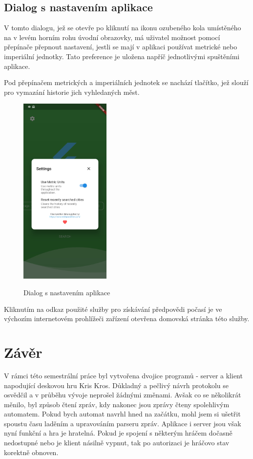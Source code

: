\documentclass[12pt, a4paper]{article}
\let\oldsection\section
\renewcommand\section{\clearpage\oldsection}
\begin{document}
\subsection{Dialog s nastavením aplikace}

V tomto dialogu, jež se otevře po kliknutí na ikonu ozubeného kola umístěného na v levém horním rohu úvodní obrazovky, má uživatel možnost pomocí přepínače přepnout nastavení, jestli se mají v aplikaci používat metrické nebo imperiální jednotky. Tato preference je uložena napříč jednotlivými spuštěními aplikace.

Pod přepínačem metrických a imperiálních jednotek se nachází tlačítko, jež slouží pro vymazání historie jich vyhledaných měst.

\begin{figure}[!ht]
\centering
{\includegraphics[width=0.40\textwidth]{img/app-settings.jpg}}
\caption{Dialog s nastavením aplikace}
\label{fig:flutter-architecture}
\end{figure}

Kliknutím na odkaz použité služby pro získávání předpovědi počasí je ve výchozím internetovém prohlížeči zařízení otevřena domovská stránka této služby.







\section{Závěr}
    V rámci této semestrální práce byl vytvořena dvojice programů - server a klient napodující deskovou hru Kris Kros. Důkladný a pečlivý návrh protokolu se osvědčil a v průběhu vývoje neprošel žádnými změnami. Avšak co se několikrát měnilo, byl způsob čtení zpráv, kdy nakonec jsou zprávy čteny spolehlivým automatem. Pokud bych automat navrhl hned na začátku, mohl jsem si ušetřit spoustu času laděním a upravováním parseru zpráv. Aplikace i server jsou však nyní funkční a hra je hratelná. Pokud je spojení s některým hráčem dočasně nedostupné nebo je klient násilně vypnut, tak po autorizaci je hráčovo stav korektně obnoven.
    



	
	
\end{document}
